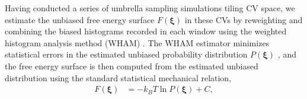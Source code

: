\documentclass[12pt]{article}
\newcommand*{\groen}[1]{#1}
\begin{document}
Having conducted a series of umbrella sampling simulations tiling CV space, we estimate the unbiased free energy surface $F(\boldsymbol\xi)$ in these CVs by reweighting and combining the biased histograms recorded in each window using the weighted histogram analysis method (\groen{WHAM}) \cite{ferguson2017bayeswham,kumar1992weighted,bartels2000analyzing,ferrenberg1989optimized,bennett1976efficient}. The WHAM estimator minimizes statistical errors in the estimated unbiased probability distribution $P(\boldsymbol\xi)$ \cite{kumar1992weighted,bartels2000analyzing,ferrenberg1989optimized,bennett1976efficient,ferguson2017bayeswham,bartels1997multidimensional,habeck2012bayesian,zhu2012convergence,gallicchio2005temperature}, and the 
free energy surface is then computed from the estimated unbiased distribution using the standard statistical mechanical relation\cite{hartmann2011two},
\begin{align} \label{unbiasedFE}
F(\boldsymbol\xi) &= -k_B T \ln{P(\boldsymbol\xi)} + C,
\end{align}
\end{document}
